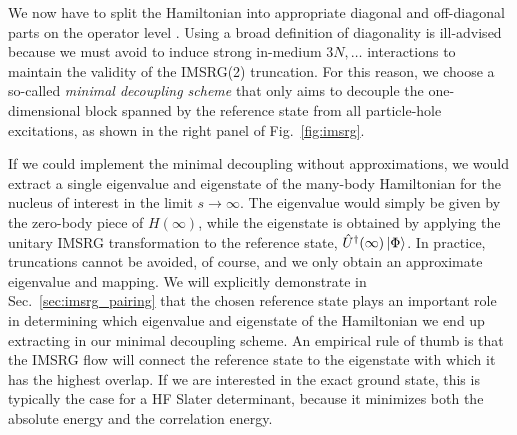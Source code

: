 We now have to split the Hamiltonian into appropriate diagonal and off-diagonal 
parts on the operator level \cite{Kutzelnigg:1982ly,Kutzelnigg:1983ve,Kutzelnigg:1984qf}. 
Using a broad definition of diagonality is ill-advised because we must 
avoid to induce strong in-medium $3N, \ldots$ interactions to maintain the
validity of the IMSRG(2) truncation. For this reason, we choose a so-called 
\emph{minimal decoupling scheme} that only aims to decouple the one-dimensional 
block spanned by the reference state from all particle-hole excitations, as
shown in the right panel of Fig.~\ref{fig:imsrg}. 

If we could implement the minimal decoupling without approximations, 
we would extract a single eigenvalue and eigenstate of the many-body Hamiltonian
for the nucleus of interest in the limit $s\to\infty$. The eigenvalue
would simply be given by the zero-body piece of $H(\infty)$, while the eigenstate
is obtained by applying the unitary IMSRG transformation to the reference
state, $\hat{U}^\dag(\infty)\,|{\Phi}\rangle$. In practice, truncations cannot be
avoided, of course, and we only obtain an approximate eigenvalue and 
mapping. We will explicitly demonstrate in Sec.~\ref{sec:imsrg_pairing}
that the chosen reference state plays an important role in determining
which eigenvalue and eigenstate of the Hamiltonian we end up extracting
in our minimal decoupling scheme. An empirical rule of thumb is that the 
IMSRG flow will connect the reference state to the eigenstate with which 
it has the highest overlap. If we are interested in the exact ground state, 
this is typically the case for a HF Slater determinant, because it minimizes 
both the absolute energy and the correlation energy. 

